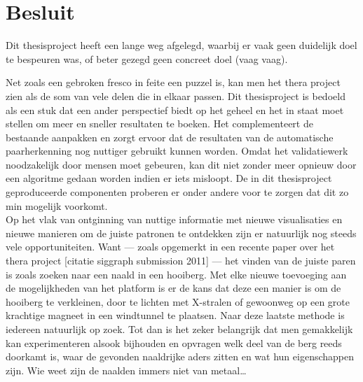 \chapter{Besluit}
\label{besluit}

Dit thesisproject heeft een lange weg afgelegd, waarbij er vaak geen duidelijk doel te bespeuren was, of beter gezegd geen concreet doel (vaag vaag).

Net zoals een gebroken fresco in feite een puzzel is, kan men het thera project zien als de som van vele delen die in elkaar passen. Dit thesisproject is bedoeld als een stuk dat een ander perspectief biedt op het geheel en het in staat moet stellen om meer en sneller resultaten te boeken. Het complementeert de bestaande aanpakken en zorgt ervoor dat de resultaten van de automatische paarherkenning nog nuttiger gebruikt kunnen worden. Omdat het validatiewerk noodzakelijk door mensen moet gebeuren, kan dit niet zonder meer opnieuw door een algoritme gedaan worden indien er iets misloopt. De in dit thesisproject geproduceerde componenten proberen er onder andere voor te zorgen dat dit zo min mogelijk voorkomt.\\

Op het vlak van ontginning van nuttige informatie met nieuwe visualisaties en nieuwe manieren om de juiste patronen te ontdekken zijn er natuurlijk nog steeds vele opportuniteiten. Want --- zoals opgemerkt in een recente paper over het thera project [citatie siggraph submission 2011] --- het vinden van de juiste paren is zoals zoeken naar een naald in een hooiberg. Met elke nieuwe toevoeging aan de mogelijkheden van het platform is er de kans dat deze een manier is om de hooiberg te verkleinen, door te lichten met X-stralen of gewoonweg op een grote krachtige magneet in een windtunnel te plaatsen. Naar deze laatste methode is iedereen natuurlijk op zoek. Tot dan is het zeker belangrijk dat men gemakkelijk kan experimenteren alsook bijhouden en opvragen welk deel van de berg reeds doorkamt is, waar de gevonden naaldrijke aders zitten en wat hun eigenschappen zijn. Wie weet zijn de naalden immers niet van metaal\ldots